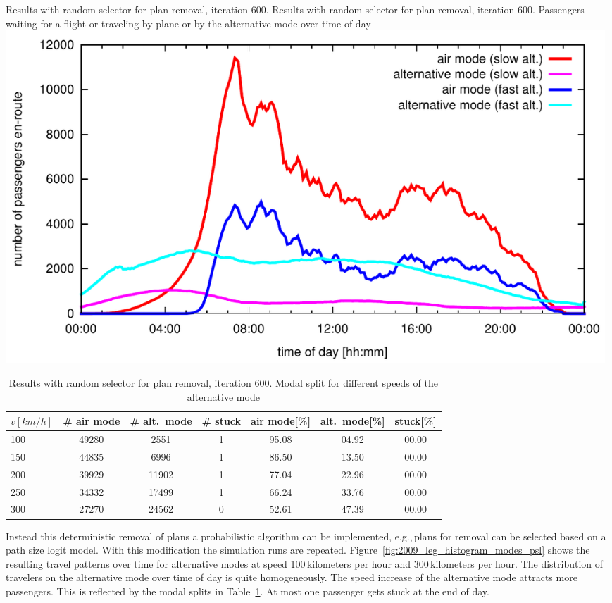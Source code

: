 \createfigure%
{Results with random selector for plan removal, iteration 600.}%
{Results with random selector for plan removal, iteration 600. Passengers waiting for a flight or traveling by plane or by the alternative mode over time of day}%
{\label{fig:2009_leg_histogram_modes_psl}}%
{\includegraphics[width=0.99\textwidth, angle=0]{./extending/figures/air/leg_histogram_improved_flight_train_en_route_1893_1897_it_600.pdf}}%
{\citet{Grether2014PhD}}


\begin{table}[t]
	\centering
	\begin{tabular}{@{}l|ccc|ccc@{}}
		$v [km/h]$	& \# air mode  & \# alt.~mode & \# stuck & air mode[\%]  & alt.~mode[\%] & stuck[\%] \\
		\hline 
		100 & 49280 & 2551 & 1 & 95.08 & 04.92 & 00.00\\	%
		150 & 44835 & 6996 & 1 & 86.50 & 13.50 & 00.00\\	%
		200 & 39929 & 11902 & 1 & 77.04 & 22.96 & 00.00\\	%
		250 & 34332 & 17499 & 1 & 66.24 & 33.76 & 00.00\\	%
		300 & 27270 & 24562 & 0 & 52.61 & 47.39 & 00.00\\	%
	\end{tabular}
	\caption{Results with random selector for plan removal, iteration 600. Modal split for different speeds of the alternative mode}
	\label{tab:2009_results_train_modal_split_psl}
\end{table}

Instead this deterministic removal of plans a probabilistic algorithm can be implemented, e.g.,\,plans for removal can be selected based on a path size logit model. 
With this modification the simulation runs are repeated. 
Figure~\ref{fig:2009_leg_histogram_modes_psl} shows the resulting travel patterns over time for alternative modes at speed 100\,kilometers per hour and 300\,kilometers per hour.  
The distribution of travelers on the alternative mode over time of day is quite homogeneously. 
The speed increase of the alternative mode attracts more passengers. 
This is reflected by the modal splits in Table~\ref{tab:2009_results_train_modal_split_psl}. 
At most one passenger gets stuck at the end of day. 

